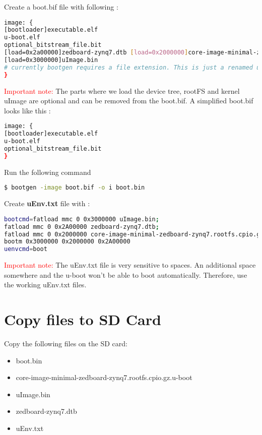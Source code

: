 Create a boot.bif file with following :\\
\begin{lstlisting}[language=bash]
image: {
[bootloader]executable.elf
u-boot.elf
optional_bitstream_file.bit
[load=0x2a00000]zedboard-zynq7.dtb [load=0x2000000]core-image-minimal-zedboard-zynq7.rootfs.cpio.gz.u-boot
[load=0x3000000]uImage.bin
# currently bootgen requires a file extension. This is just a renamed uImage
}
\end{lstlisting}

\textcolor{red}{Important note:}
The parts where we load the device tree, rootFS and kernel uImage are optional and can be removed from the boot.bif. A simplified boot.bif looks like this : 

\begin{lstlisting}[language=bash]
image: {
[bootloader]executable.elf
u-boot.elf
optional_bitstream_file.bit
}
\end{lstlisting}


Run the following command
\begin{lstlisting}[language=bash]
$ bootgen -image boot.bif -o i boot.bin
\end{lstlisting}

Create \textbf{uEnv.txt} file with :
\begin{lstlisting}[language=bash]
bootcmd=fatload mmc 0 0x3000000 uImage.bin;
fatload mmc 0 0x2A00000 zedboard-zynq7.dtb;
fatload mmc 0 0x2000000 core-image-minimal-zedboard-zynq7.rootfs.cpio.gz.u-boot;
bootm 0x3000000 0x2000000 0x2A00000
uenvcmd=boot
\end{lstlisting}

\textcolor{red}{Important note:} The uEnv.txt file is very sensitive to spaces. An additional space somewhere and the u-boot won't be able to boot automatically. Therefore, use the working uEnv.txt files.

\section{Copy files to SD Card}

Copy the following files on the SD card:
\begin{itemize}[label=$\bullet$]
\item boot.bin
\item core-image-minimal-zedboard-zynq7.rootfs.cpio.gz.u-boot
\item uImage.bin
\item zedboard-zynq7.dtb
\item uEnv.txt
\end{itemize}

